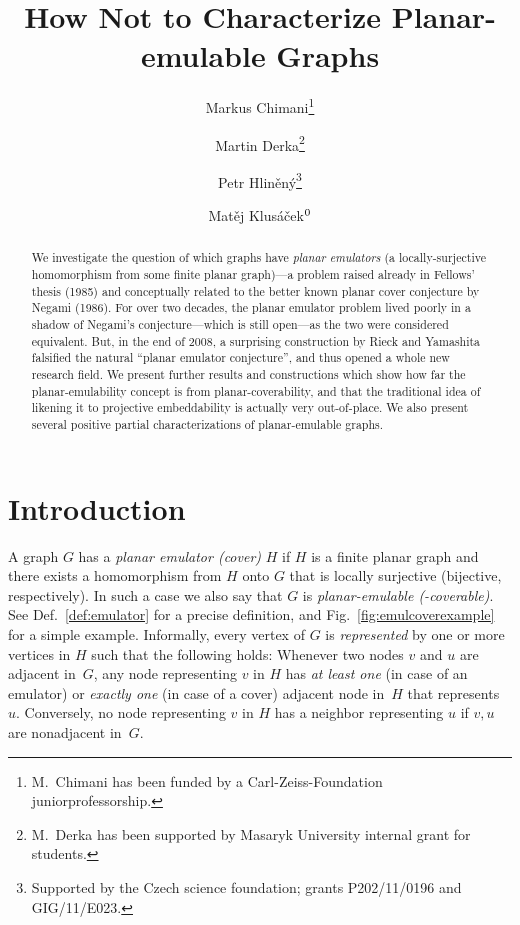 \documentclass[envcountsect,envcountsame]{llncs}
\begin{document}
\title{How Not to Characterize Planar-emulable Graphs}
\author{Markus Chimani\thanks{M.~Chimani has been funded by a Carl-Zeiss-Foundation juniorprofessorship.}
	\and Martin Derka\thanks{M.~Derka has been supported by
	 Masaryk University internal grant for students.}
	\and Petr Hlin\v{e}n\'y\thanks{Supported by the Czech
	 science foundation; grants P202/11/0196 and GIG/11/E023.}
	\and Mat\v{e}j Klus\'a\v{c}ek${}^{\mbox{\scriptsize\thefootnote}}$}
\maketitle

\begin{abstract}
We investigate the question of which graphs have {\em planar emulators}
(a locally-surjective homomorphism from some finite planar graph)---a problem raised already in Fellows' thesis (1985) and conceptually related to
the better known planar cover conjecture by Negami (1986).
For over two decades, the planar emulator problem lived poorly in a shadow of
Negami's conjecture---which is still open---as the two were considered
equivalent.
But, in the end of 2008, a surprising construction by Rieck and Yamashita 
falsified the natural ``planar emulator conjecture'', 
and thus opened a whole new research field.
We present further results and constructions which show
how far the planar-emulability concept is from planar-coverability,
and that the traditional idea of likening it to projective embeddability
is actually very out-of-place.
We also present several positive partial characterizations
of planar-emulable graphs.
\end{abstract}







\section{Introduction}
\label{sec:intro}

A graph $G$ has a {\em planar emulator (cover)} $H$ if $H$ is a
finite planar graph and there exists a homomorphism from $H$ onto $G$ that is locally
surjective (bijective, respectively).
In such a case we also say that $G$ is {\em planar-emulable (-coverable)}.
See Def.~\ref{def:emulator} for a precise
definition, and Fig.~\ref{fig:emulcoverexample} for a simple example. 
Informally, every vertex of $G$ is {\em represented} by one or more
vertices in $H$ such that the following holds:
Whenever two nodes $v$ and $u$ are adjacent in~$G$, any node representing $v$ in $H$
has \emph{at least one} (in case of an emulator) or \emph{exactly one} (in case
of a cover) adjacent node in~$H$ that represents~$u$.
Conversely, no node representing $v$ in $H$ has a neighbor representing $u$
if $v,u$ are nonadjacent in~$G$.
\end{document}
